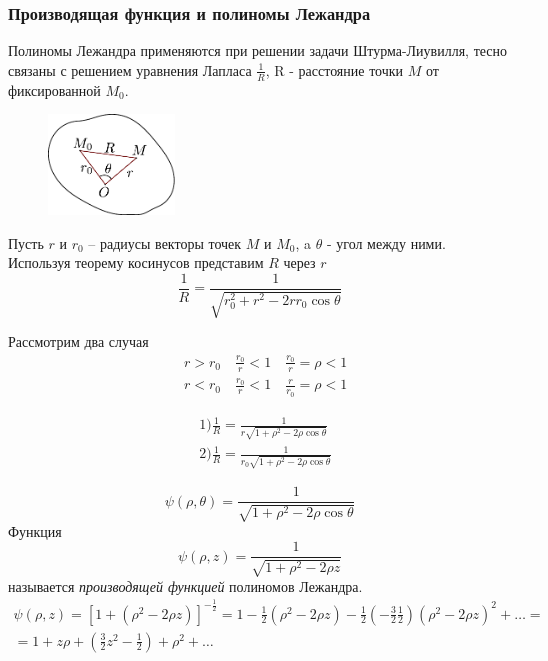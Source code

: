 \subsubsection{Производящая функция и полиномы Лежандра}
Полиномы Лежандра применяются при решении задачи Штурма-Лиувилля, тесно связаны с решением уравнения Лапласа $\frac{1}{R}$, R - расстояние точки $M$ от фиксированной $M_0$.\\
\begin{figure}
	\centering
	\includegraphics[width=0.3\textwidth]{figLejandr1.pdf}
\end{figure}
Пусть $r$ и $r_0$ -- радиусы векторы точек $M$ и $M_0$, a $\theta$ - угол между ними. 
Используя теорему косинусов представим $R$ через $r$
\[
    \frac{1}{R} = \frac{1}{\sqrt{r_0^2 + r^2 - 2 r r_0 \cos \theta}}
\]

Рассмотрим два случая
\begin{align*}
    &r > r_0 \quad \frac{r_0}{r} < 1 \quad \frac{r_0}{r} = \rho < 1\\
	&r < r_0 \quad \frac{r_0}{r} < 1 \quad \frac{r}{r_0} = \rho < 1
\end{align*}

\begin{align*}
    &1) \frac{1}{R} = \frac{1}{r \sqrt{1 + \rho^2 - 2 \rho \cos \theta}}\\
	&2) \frac{1}{R } = \frac{1}{r_0 \sqrt{1 + \rho^2 - 2 \rho \cos \theta}}
\end{align*}

\[ 
    \psi (\rho, \theta) = \frac{1}{\sqrt{1 + \rho^2 - 2 \rho \cos \theta}}
\]
Функция
\begin{equation}
    \psi(\rho, z) = \frac{1}{\sqrt{1 + \rho^2 - 2 \rho z}}
    \label{equ:poly}
\end{equation}
называется \textit{производящей функцией} полиномов Лежандра.
\begin{multline}
    \psi (\rho, z) = \left[1 + (\rho^2 - 2 \rho z) \right]^{-\frac{1}{2}} = 1 - \frac{1}{2} (\rho^2 - 2 \rho z) - \frac{1}{2} \left(- \frac{3}{2} \frac{1}{2}\right) (\rho^2 - 2 \rho z)^2 + \ldots = \\= 1 + z \rho + \left( \frac{3}{2}z^2 - \frac{1}{2}\right) + \rho^2 + \ldots
\end{multline}

